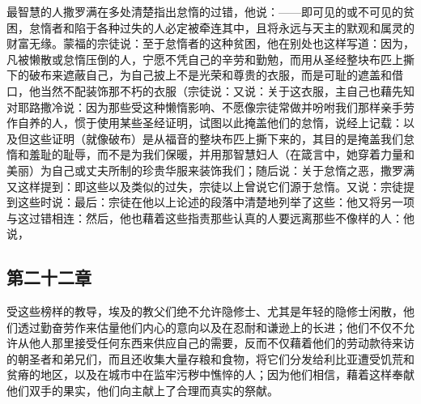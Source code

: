 最智慧的人撒罗满在多处清楚指出怠惰的过错，他说：——即可见的或不可见的贫困，怠惰者和陷于各种过失的人必定被牵连其中，且将永远与天主的默观和属灵的财富无缘。蒙福的宗徒说：至于怠惰者的这种贫困，他在别处也这样写道：因为，凡被懒散或怠惰压倒的人，宁愿不凭自己的辛劳和勤勉，而用从圣经整块布匹上撕下的破布来遮蔽自己，为自己披上不是光荣和尊贵的衣服，而是可耻的遮盖和借口，他当然不配装饰那不朽的衣服（宗徒说：又说：关于这衣服，主自己也藉先知对耶路撒冷说：因为那些受这种懒惰影响、不愿像宗徒常做并吩咐我们那样亲手劳作自养的人，惯于使用某些圣经证明，试图以此掩盖他们的怠惰，说经上记载：以及但这些证明（就像破布）是从福音的整块布匹上撕下来的，其目的是掩盖我们怠惰和羞耻的耻辱，而不是为我们保暖，并用那智慧妇人（在箴言中，她穿着力量和美丽）为自己或丈夫所制的珍贵华服来装饰我们；随后说：关于怠惰之恶，撒罗满又这样提到：即这些以及类似的过失，宗徒以上曾说它们源于怠惰。又说：宗徒提到这些时说：最后：宗徒在他以上论述的段落中清楚地列举了这些：他又将另一项与这过错相连：然后，他也藉着这些指责那些认真的人要远离那些不像样的人：他说，\par


\subsection{第二十二章}

\par

受这些榜样的教导，埃及的教父们绝不允许隐修士、尤其是年轻的隐修士闲散，他们透过勤奋劳作来估量他们内心的意向以及在忍耐和谦逊上的长进；他们不仅不允许从他人那里接受任何东西来供应自己的需要，反而不仅藉着他们的劳动款待来访的朝圣者和弟兄们，而且还收集大量存粮和食物，将它们分发给利比亚遭受饥荒和贫瘠的地区，以及在城市中在监牢污秽中憔悴的人；因为他们相信，藉着这样奉献他们双手的果实，他们向主献上了合理而真实的祭献。\par

